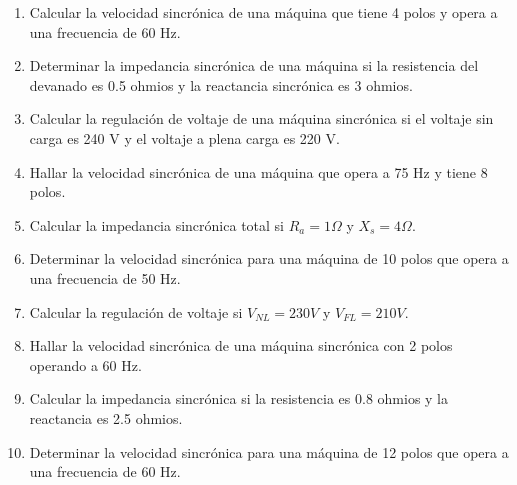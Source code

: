 \documentclass[../main]{subfiles}
\begin{document}
\begin{enumerate}
    \item Calcular la velocidad sincrónica de una máquina que tiene 4 polos y opera a una frecuencia de 60 Hz.
    \item Determinar la impedancia sincrónica de una máquina si la resistencia del devanado es 0.5 ohmios y la reactancia sincrónica es 3 ohmios.
    \item Calcular la regulación de voltaje de una máquina sincrónica si el voltaje sin carga es 240 V y el voltaje a plena carga es 220 V.
    \item Hallar la velocidad sincrónica de una máquina que opera a 75 Hz y tiene 8 polos.
    \item Calcular la impedancia sincrónica total si $R_a = 1 \Omega$ y $X_s = 4 \Omega$.
    \item Determinar la velocidad sincrónica para una máquina de 10 polos que opera a una frecuencia de 50 Hz.
    \item Calcular la regulación de voltaje si $V_{NL} = 230 V$ y $V_{FL} = 210 V$.
    \item Hallar la velocidad sincrónica de una máquina sincrónica con 2 polos operando a 60 Hz.
    \item Calcular la impedancia sincrónica si la resistencia es 0.8 ohmios y la reactancia es 2.5 ohmios.
    \item Determinar la velocidad sincrónica para una máquina de 12 polos que opera a una frecuencia de 60 Hz.
\end{enumerate}
\end{document}
